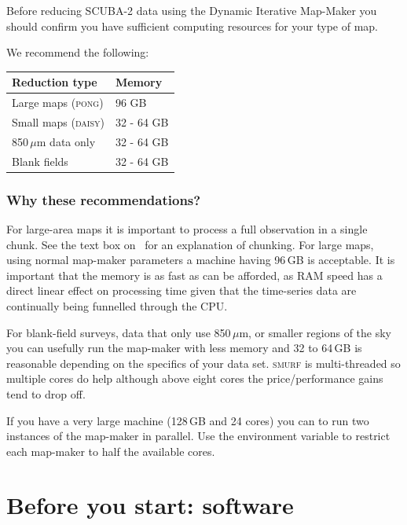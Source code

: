 \documentclass[11pt,oneside,chapters]{starlink}
\begin{document}
Before reducing SCUBA-2 data using the Dynamic Iterative Map-Maker you should confirm you have sufficient computing resources for your type of map.

We recommend the following:
\begin{table}[h!]
  \centering
  \begin{tabular}{ll}
    \hline
    \textbf{Reduction type} &\textbf{Memory} \\
    \hline
    Large maps (\textsc{pong})& 96 GB\\
    Small maps (\textsc{daisy})&32 - 64 GB\\
    850\,$\mu$m data only&32 - 64 GB\\
    Blank fields&32 - 64 GB\\
    \hline
  \end{tabular}
\end{table}

\subsubsection*{Why these recommendations?}

For large-area maps it is important to process a full observation in a
single chunk. See the text box on
\
for an explanation of chunking. For large maps, using normal map-maker
parameters a machine having 96\,GB is acceptable. It is important that
the memory is as fast as can be afforded, as RAM speed has a direct
linear effect on processing time given that the time-series data are
continually being funnelled through the CPU.

For blank-field surveys, data that only use 850\,$\mu$m, or smaller
regions of the sky you can usefully run the map-maker with less memory
and 32 to 64\,GB is reasonable depending on the specifics of your data
set. \textsc{smurf} is multi-threaded so multiple cores do help although above
eight cores the price/performance gains tend to drop off.

If you have a very large machine (128\,GB and 24 cores) you can to run
two instances of the map-maker in parallel. Use the 
environment variable to restrict each map-maker to half the available
cores.


\section{Before you start: software}
\end{document}

